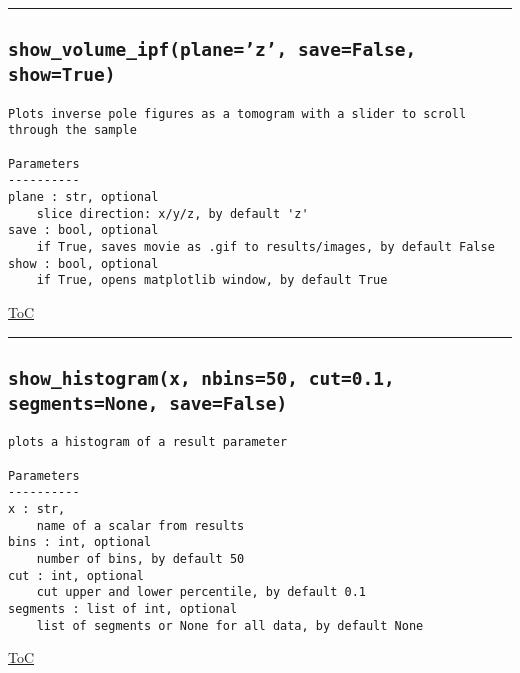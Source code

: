 \documentclass{article}
\begin{document}


\vspace{5mm}

\hrule

\subsection*{\texttt{show\_volume\_ipf(plane='z', save=False, show=True)}}

\begin{lstlisting}[language=docstring]
Plots inverse pole figures as a tomogram with a slider to scroll through the sample

Parameters
----------
plane : str, optional
    slice direction: x/y/z, by default 'z'
save : bool, optional
    if True, saves movie as .gif to results/images, by default False
show : bool, optional
    if True, opens matplotlib window, by default True
\end{lstlisting}

\begin{flushright}

\hyperref[toc]{ToC}

\end{flushright}



\vspace{5mm}

\hrule

\subsection*{\texttt{show\_histogram(x, nbins=50, cut=0.1, segments=None, save=False)}}

\begin{lstlisting}[language=docstring]
plots a histogram of a result parameter

Parameters
----------
x : str,
    name of a scalar from results
bins : int, optional
    number of bins, by default 50
cut : int, optional
    cut upper and lower percentile, by default 0.1
segments : list of int, optional
    list of segments or None for all data, by default None
\end{lstlisting}

\begin{flushright}

\hyperref[toc]{ToC}

\end{flushright}
\end{document}
